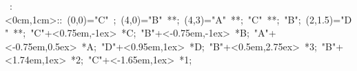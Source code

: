 

\hbox{
\xy    <-1cm,0cm>:<0cm,1cm>::
       (0,0)="C" ; (4,0)="B" **\dir{-}; 
       (4,3)="A" **\dir{-};  "C" **\dir{-};
       "B"; (2,1.5)="D" **\dir{-}; 
       "C"+<0.75em,-1ex> *{C};
       "B"+<-0.75em,-1ex> *{B};
       "A"+<-0.75em,0.5ex> *{A};
       "D"+<0.95em,1ex> *{D};
       "B"+<0.5em,2.75ex> *{3};
       "B"+<1.74em,1ex> *{2};
       "C"+<-1.65em,1ex> *{1};
\endxy}
	   
